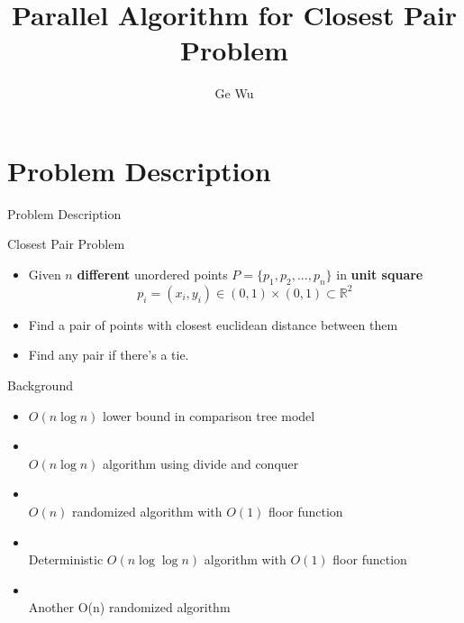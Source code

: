 \documentclass[18pt]{beamer}
\title[Parallel Algorithm for Closest Pair Problem]{Parallel Algorithm for Closest Pair Problem}
\subtitle{}
\author{Ge Wu}
\institute{Institute for Theoretical Informatics}
\def \loose {15pt}
\begin{document}

\begin{frame}
\titlepage
\end{frame}


\section{Problem Description}

\begin{frame}{Problem Description}
\begin{block}{Closest Pair Problem}
\begin{itemize}
\item Given $n$ \textbf{different} unordered points $P = \{p_1,p_2, ... ,p_n\}$ in \textbf{unit square} \\
$$p_i = (x_i, y_i) \in (0, 1) \times (0,1) \subset \mathbb{R}^2$$
\item Find a pair of points with closest euclidean distance between them
\item Find any pair if there's a tie.
\end{itemize}
\end{block}
\end{frame}

\begin{frame}{Background}
\begin{itemize}
	\setlength{\itemsep}{\loose}
	\item $O(n \log n)$ lower bound in comparison tree model
	\item \textbf{\cite{Bentley:1976:DMS:800113.803652}} \\
		$O(n\log n)$ algorithm using divide and conquer
	\item \textbf{\cite{major}}\\ \alert{$O(n)$ randomized algorithm with $O(1)$ floor function}
 	\item \textbf{\cite{fortune1978note}} \\ Deterministic $O(n \log \log n)$ algorithm with $O(1)$ floor function
 	\item \textbf{\cite{khuller1995simple}} \\ Another O(n) randomized algorithm
\end{itemize}
\end{frame}
\end{document}
